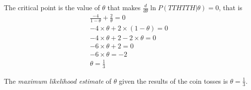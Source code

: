 \documentclass[leqno]{article}
\begin{document}
\noindent The critical point is the value of $\theta$ that makes $\frac{d}{d\theta}\ln P(TTHTTH|\theta) = 0$, that is
\begin{equation*}
\begin{split}
&\frac{-4}{1 - \theta} + \frac{2}{\theta} = 0
\\
&-4 \times \theta + 2 \times (1 - \theta) = 0
\\
&-4 \times \theta + 2 - 2 \times \theta = 0
\\
&-6 \times \theta + 2 = 0
\\
&-6 \times \theta = -2
\\
& \theta = \frac{1}{3}
\end{split}  
\end{equation*} 

\noindent The \textit{maximum likelihood estimate} of $\theta$ given the results of the coin tosses is $\theta = \frac{1}{3}$.
\end{document}
